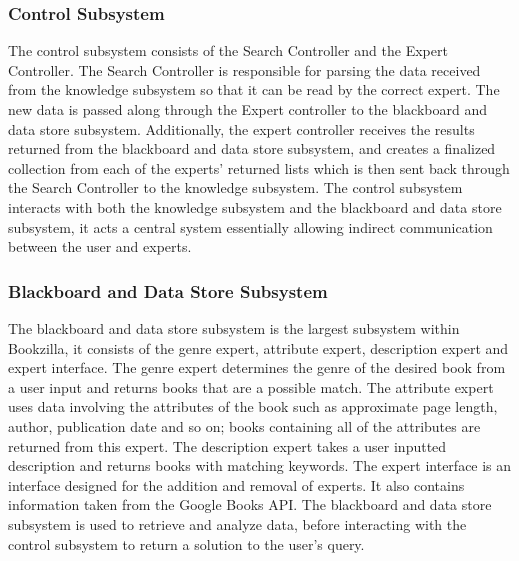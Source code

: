 \documentclass[12pt]{article}
\begin{document}
\subsubsection{Control Subsystem}

The control subsystem consists of the Search Controller and the Expert Controller. The Search Controller is responsible for parsing the data received from the knowledge subsystem so that it can be read by the correct expert. The new data is passed along through the Expert controller to the blackboard and data store subsystem. Additionally, the expert controller receives the results returned from the blackboard and data store subsystem, and creates a finalized collection from each of the experts' returned lists which is then sent back through the Search Controller to the knowledge subsystem. The control subsystem interacts with both the knowledge subsystem and the blackboard and data store subsystem, it acts a central system essentially allowing indirect communication between the user and experts.

\subsubsection{Blackboard and Data Store Subsystem}

The blackboard and data store subsystem is the largest subsystem within Bookzilla, it consists of the genre expert, attribute expert, description expert and expert interface. The genre expert determines the genre of the desired book from a user input and returns books that are a possible match. The attribute expert uses data involving the attributes of the book such as approximate page length, author, publication date and so on; books containing all of the attributes are returned from this expert. The description expert takes a user inputted description and returns books with matching keywords. The expert interface is an interface designed for the addition and removal of experts. It also contains information taken from the Google Books API. The blackboard and data store subsystem is used to retrieve and analyze data, before interacting with the control subsystem to return a solution to the user's query.


	
\end{document}
